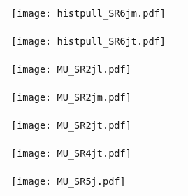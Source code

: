 \documentclass[landscape,12pt,a4paper]{article}
\begin{document}
\begin{figure}[h]\begin{center}\begin{tabular}{cc}\texttt{[image: histpull\_SR6jm.pdf]}\end{tabular}\end{center}\end{figure}
\begin{figure}[h]\begin{center}\begin{tabular}{cc}\texttt{[image: histpull\_SR6jt.pdf]}\end{tabular}\end{center}\end{figure}
\clearpage
\begin{figure}[h]\begin{center}\begin{tabular}{cc}\texttt{[image: MU\_SR2jl.pdf]}\end{tabular}\end{center}\end{figure}
\begin{figure}[h]\begin{center}\begin{tabular}{cc}\texttt{[image: MU\_SR2jm.pdf]}\end{tabular}\end{center}\end{figure}
\begin{figure}[h]\begin{center}\begin{tabular}{cc}\texttt{[image: MU\_SR2jt.pdf]}\end{tabular}\end{center}\end{figure}
\begin{figure}[h]\begin{center}\begin{tabular}{cc}\texttt{[image: MU\_SR4jt.pdf]}\end{tabular}\end{center}\end{figure}
\begin{figure}[h]\begin{center}\begin{tabular}{cc}\texttt{[image: MU\_SR5j.pdf]}\end{tabular}\end{center}\end{figure}
\end{document}
